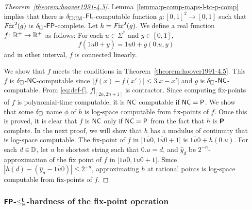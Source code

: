 \documentclass[envcountsame,orivec,oribibl]{llncs}
\begin{document}
\begin{proof}
[Theorem~\ref{theorem:hoover1991-4.5}]
 Lemma~\ref{lemma:p-comp-maps-l-to-p-comp} implies that
 there is $\delta _{\square \mathrm{CM}}$-$\mathsf{FL}$-computable function 
 $g \colon [0,1]^2 \to [0,1]$ such that $\mathit{Fix}^2(g)$ is
 $\delta _\square$-$\mathsf{FP}$-complete. Let $h = \mathit{Fix}^2(g)$.
 We define a real function $f \colon \mathbb R^+ \to \mathbb R^+$ as follows:
 For each $u \in \Sigma^*$ and $y \in [0, 1]$,
 \begin{equation}
  \label{eq:def-f}
 f(\overline{1u0} + y) = \overline{1u0} + g(0.u, y)
 \end{equation}
 and in other interval, $f$ is connected linearly.

 We show that $f$ meets the conditions in Theorem~\ref{theorem:hoover1991-4.5}.
 This $f$ is $\delta _\square$-$\mathsf{NC}$-computable since 
 $|f(x) - f(x')| \le 3|x-x'|$ and $g$ is $\delta _\square$-$\mathsf{NC}$-computable.
 From \eqref{eq:def-f},  $f|_{[2n, 2n+1]}$ is contractor.
 Since computing fix-points of $f$ is polynomial-time computable, 
 it is $\mathsf{NC}$ computable if $\mathsf{NC} = \mathsf{P}$.
 We show that some $\delta _\square$ name $\phi$ of $h$ is log-space computable 
 from fix-points of $f$.
 Once this is proved, it is clear that $f$ is $\mathsf{NC}$ only if 
 $\mathsf{NC} = \mathsf{P}$ from the fact that $h$ is $\text{\bfseries \sffamily \upshape P}$ complete.
 In the next proof, we will show that $h$ has a modulus of continuity that is
 log-space computable. 
 The fix-point of $f$ in $\bigl[ \overline{1u0}, \overline{1u0}+1 \bigr]$ is
 $\overline{1u0} + h(0.u)$.
 For each $d \in \mathbb D$, let $u$ be shortest string such that $0.u = d$,
 and $\hat y_d$ be $2^{-n}$-approximation of the fix point of $f$ in
 $\bigl[ \overline{1u0}, \overline{1u0}+1 \bigr]$.
 Since  $\left|h(d) - \left( \hat y_d - \overline{1u0} \right)\right| \le 2^{-n}$,
 approximating $h$ at rational points is log-space computable from fix-points of $f$.
\end{proof}

\subsubsection{$\text{\bfseries \sffamily \upshape FP}$-$\leq _{\mathrm B} ^{\text{\bfseries \sffamily \upshape L}}$-hardness of the fix-point operation}
\end{document}
